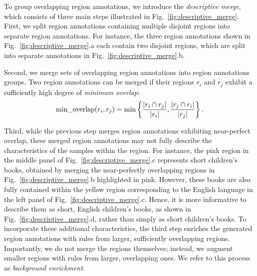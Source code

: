 \documentclass[lettersize,journal]{IEEEtran}
\begin{document}
To group overlapping region annotations, we introduce the \textit{descriptive merge}, which consists of three main steps illustrated in Fig.~\ref{fig:descriptive_merge}. First, we split region annotations containing multiple disjoint regions into separate region annotations. For instance, the three region annotations shown in Fig.~\ref{fig:descriptive_merge}.a each contain two disjoint regions, which are split into separate annotations in Fig.~\ref{fig:descriptive_merge}.b.
  
Second, we merge sets of overlapping region annotations into region annotations groups.
Two region annotations can be merged if their regions $r_i$ and $r_j$ exhibit a sufficiently high degree of \textit{minimum overlap}:
\begin{equation}
\text{min\_overlap}(r_i, r_j) = \min \left \{ \frac{|r_i \cap r_j|}{|r_i|}, \frac{|r_j \cap r_i|}{|r_j|} \right \}. \notag
\end{equation}

Third, while the previous step merges region annotations exhibiting near-perfect overlap, these merged region annotations may not fully describe the characteristics of the samples within the region. For instance, the pink region in the middle panel of Fig.~\ref{fig:descriptive_merge}.c represents short children's books, obtained by merging the near-perfectly overlapping regions in Fig.~\ref{fig:descriptive_merge}.b highlighted in pink. However, these books are also fully contained within the yellow region corresponding to the English language in the left panel of Fig.~\ref{fig:descriptive_merge}.c. Hence, it is more informative to describe them as short, English children's books, as shown in Fig.~\ref{fig:descriptive_merge}.d, rather than simply as short children's books.
To incorporate these additional characteristics, the third step enriches the generated region annotations with rules from larger, sufficiently overlapping regions.
Importantly, we do not merge the regions themselves; instead, we augment smaller regions with rules from larger, overlapping ones.
We refer to this process as \textit{background enrichment}.
\end{document}
